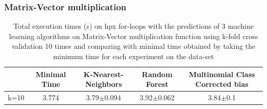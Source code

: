 \subsubsection{Matrix-Vector multiplication}

\begin{table}[h]
	\centering
	\caption{Total execution times (s) on hpx for-loops with the predictions of 3 machine learning algorithms on Matrix-Vector multiplication function using k-fold cross validation 10 times and comparing with minimal time obtained by taking the minimum time for each experiment on the data-set}
	\label{my-label}
	\begin{tabular}{|c|c|c|c|c|}
		\hline
		& Minimal Time&K-Nearest-Neighbors & Random Forest &Multinomial Class Corrected bias\\ \hline
		k=10  &3.774&
		3.79$\pm$0.094       & 3.92$\pm$0.062&3.84$\pm$0.1 \\ \hline
	\end{tabular}
\end{table}

